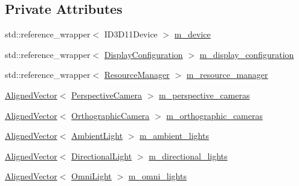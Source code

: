 \subsection*{Private Attributes}
\begin{DoxyCompactItemize}
\item 
std\+::reference\+\_\+wrapper$<$ I\+D3\+D11\+Device $>$ \mbox{\hyperlink{classmage_1_1rendering_1_1_world_a58ea474801fba5e39ff4f8a7d4c0a842}{m\+\_\+device}}
\item 
std\+::reference\+\_\+wrapper$<$ \mbox{\hyperlink{classmage_1_1rendering_1_1_display_configuration}{Display\+Configuration}} $>$ \mbox{\hyperlink{classmage_1_1rendering_1_1_world_a1a3a7ddfc44d74195e60a9177d4f2f80}{m\+\_\+display\+\_\+configuration}}
\item 
std\+::reference\+\_\+wrapper$<$ \mbox{\hyperlink{classmage_1_1rendering_1_1_resource_manager}{Resource\+Manager}} $>$ \mbox{\hyperlink{classmage_1_1rendering_1_1_world_a89edf9b86ab3a8644c15e7f521e8642a}{m\+\_\+resource\+\_\+manager}}
\item 
\mbox{\hyperlink{namespacemage_a8664bfb5ce2179fc64eae9f82c8a5ba8}{Aligned\+Vector}}$<$ \mbox{\hyperlink{classmage_1_1rendering_1_1_perspective_camera}{Perspective\+Camera}} $>$ \mbox{\hyperlink{classmage_1_1rendering_1_1_world_a20712094ac433ad1651b0c7730bba96b}{m\+\_\+perspective\+\_\+cameras}}
\item 
\mbox{\hyperlink{namespacemage_a8664bfb5ce2179fc64eae9f82c8a5ba8}{Aligned\+Vector}}$<$ \mbox{\hyperlink{classmage_1_1rendering_1_1_orthographic_camera}{Orthographic\+Camera}} $>$ \mbox{\hyperlink{classmage_1_1rendering_1_1_world_a6cbb80ebd76a1f7121b455251fcab6db}{m\+\_\+orthographic\+\_\+cameras}}
\item 
\mbox{\hyperlink{namespacemage_a8664bfb5ce2179fc64eae9f82c8a5ba8}{Aligned\+Vector}}$<$ \mbox{\hyperlink{classmage_1_1rendering_1_1_ambient_light}{Ambient\+Light}} $>$ \mbox{\hyperlink{classmage_1_1rendering_1_1_world_a0c63647dbf30b3df91e6cfbb483847c9}{m\+\_\+ambient\+\_\+lights}}
\item 
\mbox{\hyperlink{namespacemage_a8664bfb5ce2179fc64eae9f82c8a5ba8}{Aligned\+Vector}}$<$ \mbox{\hyperlink{classmage_1_1rendering_1_1_directional_light}{Directional\+Light}} $>$ \mbox{\hyperlink{classmage_1_1rendering_1_1_world_a215d8925979f0cae6471315795f09cec}{m\+\_\+directional\+\_\+lights}}
\item 
\mbox{\hyperlink{namespacemage_a8664bfb5ce2179fc64eae9f82c8a5ba8}{Aligned\+Vector}}$<$ \mbox{\hyperlink{classmage_1_1rendering_1_1_omni_light}{Omni\+Light}} $>$ \mbox{\hyperlink{classmage_1_1rendering_1_1_world_ad7314066fa640f62ff56f90b0762a66d}{m\+\_\+omni\+\_\+lights}}

\end{DoxyCompactItemize}
